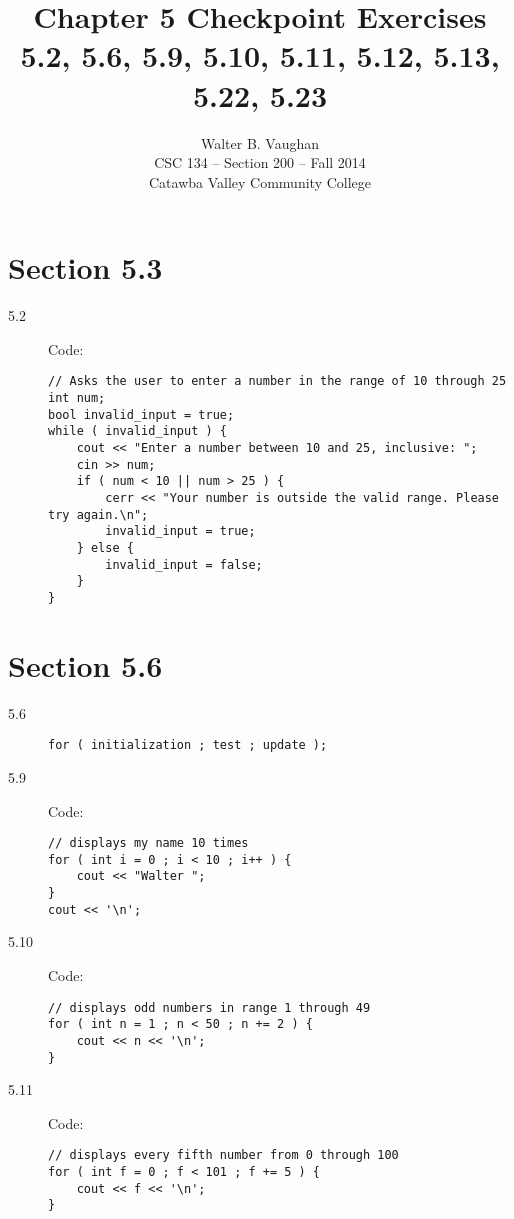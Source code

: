 \documentclass[11pt]{article}
\author{Walter B. Vaughan\\
        \small CSC 134 -- Section 200 -- Fall 2014\\
        \small Catawba Valley Community College}
\title{Chapter 5 Checkpoint Exercises \\ 
       \footnotesize{5.2, 5.6, 5.9, 5.10, 5.11, 5.12, 5.13, 5.22, 5.23}}
\date{\vspace{-5ex}}
\begin{document}
\maketitle

\section*{Section 5.3}

\begin{description}

	\item[5.2] Code: \begin{lstlisting}
// Asks the user to enter a number in the range of 10 through 25
int num;
bool invalid_input = true;
while ( invalid_input ) {
	cout << "Enter a number between 10 and 25, inclusive: ";
	cin >> num;
	if ( num < 10 || num > 25 ) {
		cerr << "Your number is outside the valid range. Please try again.\n";
		invalid_input = true;
	} else {
		invalid_input = false;
	}
}
	\end{lstlisting}
	
\end{description}

\section*{Section 5.6}

\begin{description}
	
	\item[5.6] \lstinline{for ( initialization ; test ; update );}
	
	\item[5.9] Code: \begin{lstlisting}
// displays my name 10 times
for ( int i = 0 ; i < 10 ; i++ ) {
	cout << "Walter ";
}
cout << '\n';
	\end{lstlisting}
	
	\item[5.10] Code: \begin{lstlisting}
// displays odd numbers in range 1 through 49
for ( int n = 1 ; n < 50 ; n += 2 ) {
	cout << n << '\n';
}
	\end{lstlisting}
	
	\item[5.11] Code: \begin{lstlisting}
// displays every fifth number from 0 through 100
for ( int f = 0 ; f < 101 ; f += 5 ) {
	cout << f << '\n';
}
	\end{lstlisting}

\end{description}
\end{document}
